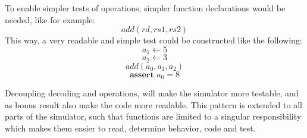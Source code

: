 To enable simpler tests of operations, simpler function declarations would be needed, like for example: $$add(rd, rs1, rs2)$$
This way, a very readable and simple test could be constructed like the following:
$$ a_1 \leftarrow 5 $$
$$ a_2 \leftarrow 3 $$
$$ add(a_0, a_1, a_2) $$
$$ \textbf{assert } a_0 = 8 $$

Decoupling decoding and operations, will make the simulator more testable, and as bonus result also make the code more readable.
This pattern is extended to all parts of the simulator, such that functions are limited to a singular responsibility which makes them easier to read, determine behavior, code and test.



